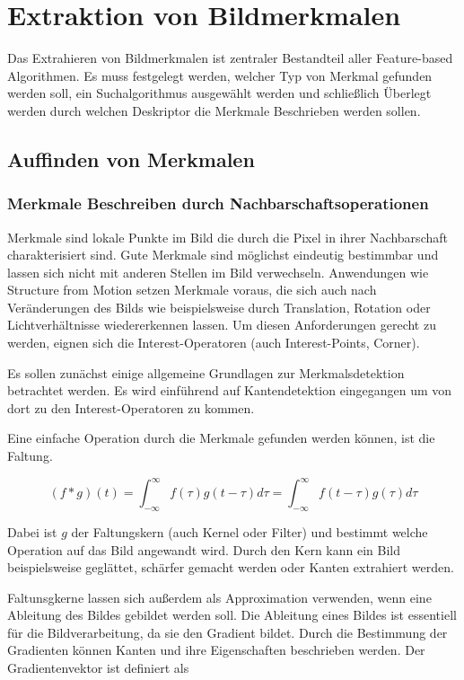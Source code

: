 \chapter{Extraktion von Bildmerkmalen}
\label{ch:merkmale}
Das Extrahieren von Bildmerkmalen ist zentraler Bestandteil aller Feature-based Algorithmen. Es muss festgelegt werden, welcher Typ von Merkmal gefunden werden soll, ein Suchalgorithmus ausgewählt werden und schlie{\ss}lich Überlegt werden durch welchen Deskriptor die Merkmale Beschrieben werden sollen.
\section{Auffinden von Merkmalen}
\subsection{Merkmale Beschreiben durch Nachbarschaftsoperationen}
Merkmale sind lokale Punkte im Bild die durch die Pixel in ihrer Nachbarschaft charakterisiert sind. Gute Merkmale sind möglichst eindeutig bestimmbar und lassen sich nicht mit anderen Stellen im Bild verwechseln. Anwendungen wie Structure from Motion setzen Merkmale voraus, die sich auch nach Veränderungen des Bilds wie beispielsweise durch Translation, Rotation oder Lichtverhältnisse wiedererkennen lassen. Um diesen Anforderungen gerecht zu werden, eignen sich die Interest-Operatoren (auch Interest-Points, Corner).

Es sollen zunächst einige allgemeine Grundlagen zur Merkmalsdetektion betrachtet werden. Es wird einführend auf Kantendetektion eingegangen um von dort zu den Interest-Operatoren zu kommen.
\newline

Eine einfache Operation durch die Merkmale gefunden werden können, ist die Faltung.

\begin{equation}
  (f*g)(t) = \int_{-\infty}^{\infty} f(\tau)g(t-\tau)d\tau = \int_{-\infty}^{\infty} f(t-\tau)g(\tau)d\tau
  \label{eq:convolution}
\end{equation}

Dabei ist $g$ der Faltungskern (auch Kernel oder Filter) und bestimmt welche Operation auf das Bild angewandt wird. Durch den Kern kann ein Bild beispielsweise geglättet, schärfer gemacht werden oder Kanten extrahiert werden.

Faltunsgkerne lassen sich au{\ss}erdem als Approximation verwenden, wenn eine Ableitung des Bildes gebildet werden soll. Die Ableitung eines Bildes ist essentiell für die Bildverarbeitung, da sie den Gradient bildet. Durch die Bestimmung der Gradienten können Kanten und ihre Eigenschaften beschrieben werden. Der Gradientenvektor ist definiert als


